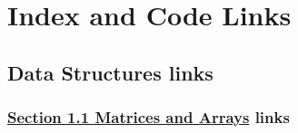 \documentclass[
]{book}
\begin{document}
\hypertarget{appendix-appendix}{%
\appendix}


\hypertarget{index-and-code-links}{%
\chapter{Index and Code Links}\label{index-and-code-links}}

\hypertarget{data-structures-links}{%
\section{Data Structures links}\label{data-structures-links}}

\hypertarget{section-1.1-matrices-and-arraysmatrices-and-arrays-links}{%
\subsection{\texorpdfstring{\protect\hyperlink{matrices-and-arrays}{Section 1.1 Matrices and Arrays} links}{Section 1.1 Matrices and Arrays links}}\label{section-1.1-matrices-and-arraysmatrices-and-arrays-links}}
\end{document}
